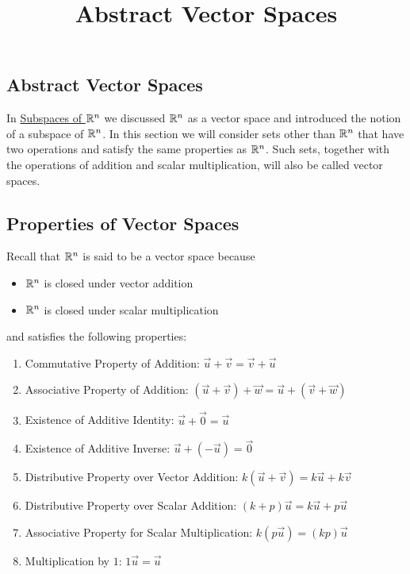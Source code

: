 \documentclass{ximera}
\title{Abstract Vector Spaces} \license{CC BY-NC-SA 4.0}
\begin{document}
\begin{abstract}
\end{abstract}
\maketitle

\begin{onlineOnly}
\section*{Abstract Vector Spaces}
\end{onlineOnly}

In \href{https://ximera.osu.edu/linearalgebradzv3/LinearAlgebraInteractiveIntro/VSP-0020/main}{Subspaces of $\mathbb{R}^n$} we discussed $\mathbb{R}^n$ as a vector space and introduced the notion of a subspace of $\mathbb{R}^n$.  
In this section we will consider sets other than $\mathbb{R}^n$ that have two operations and satisfy the same properties as $\mathbb{R}^n$.  Such sets, together with the operations of addition and scalar multiplication, will also be called vector spaces.

\subsection*{Properties of Vector Spaces} 

Recall that $\mathbb{R}^n$ is said to be a vector space because
\begin{itemize}
    \item[] $\mathbb{R}^n$ is closed under vector addition
    \item[] $\mathbb{R}^n$ is closed under scalar multiplication
\end{itemize}
and satisfies the following properties:

  \begin{enumerate}
  \item 
  Commutative Property of Addition:\quad
  $\vec{u}+\vec{v}=\vec{v}+\vec{u}$
  \item 
  Associative Property of Addition:\quad
  $(\vec{u}+\vec{v})+\vec{w}=\vec{u}+(\vec{v}+\vec{w})$
  \item 
  Existence of Additive Identity:\quad
  $\vec{u}+\vec{0}=\vec{u}$
  \item 
  Existence of Additive Inverse:\quad
  $\vec{u}+(-\vec{u})=\vec{0}$
  \item
  Distributive Property over Vector Addition:\quad
  $k(\vec{u}+\vec{v})=k\vec{u}+k\vec{v}$
  \item
  Distributive Property over Scalar Addition:\quad
  $(k+p)\vec{u}=k\vec{u}+p\vec{u}$
  \item 
  Associative Property for Scalar Multiplication:\quad
  $k(p\vec{u})=(kp)\vec{u}$
  \item 
  Multiplication by $1$:\quad
  $1\vec{u}=\vec{u}$
  \end{enumerate}
\end{document}
